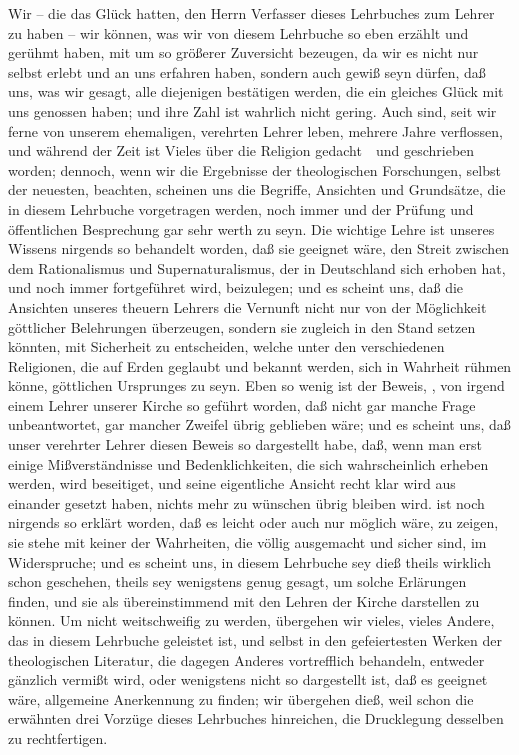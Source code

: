 Wir -- die das Glück hatten, den Herrn Verfasser dieses Lehrbuches zum Lehrer zu haben -- wir können, was wir von diesem Lehrbuche so eben erzählt und gerühmt haben, mit um so größerer Zuversicht bezeugen, da wir es nicht nur selbst erlebt und an uns erfahren haben, sondern auch gewiß seyn dürfen, daß uns, was wir gesagt, alle diejenigen bestätigen werden, die ein gleiches Glück mit uns genossen haben; und ihre Zahl ist wahrlich nicht gering. Auch sind, seit wir ferne von unserem ehemaligen, verehrten Lehrer leben, mehrere Jahre verflossen, und während der Zeit ist Vieles über die Religion gedacht~\ und geschrieben worden; dennoch, wenn wir die Ergebnisse der theologischen Forschungen, selbst der neuesten, beachten, scheinen uns die Begriffe, Ansichten und Grundsätze, die in diesem Lehrbuche vorgetragen werden, noch immer  und der Prüfung und öffentlichen Besprechung gar sehr werth zu seyn. Die wichtige Lehre  ist unseres Wissens nirgends so behandelt worden, daß sie geeignet wäre, den Streit zwischen dem Rationalismus und Supernaturalismus, der in Deutschland sich erhoben hat, und noch immer fortgeführet wird, beizulegen; und es scheint uns, daß die Ansichten unseres theuern Lehrers die Vernunft nicht nur von der Möglichkeit göttlicher Belehrungen überzeugen, sondern sie zugleich in den Stand setzen könnten, mit Sicherheit zu entscheiden, welche unter den verschiedenen Religionen, die auf Erden geglaubt und bekannt werden, sich in Wahrheit rühmen könne, göttlichen Ursprunges zu seyn. Eben so wenig ist der Beweis, , von irgend einem Lehrer unserer Kirche so geführt worden, daß nicht gar manche Frage unbeantwortet, gar mancher Zweifel übrig geblieben wäre; und es scheint uns, daß unser verehrter Lehrer diesen Beweis so dargestellt habe, daß, wenn man erst einige Mißverständnisse und Bedenklichkeiten, die sich wahrscheinlich erheben werden, wird beseitiget, und seine eigentliche Ansicht recht klar wird aus einander gesetzt haben, nichts mehr zu wünschen übrig bleiben wird.  ist noch nirgends so erklärt worden, daß es leicht oder auch nur möglich wäre, zu zeigen, sie stehe mit keiner der Wahrheiten, die völlig ausgemacht und sicher sind, im Widerspruche; und es scheint uns, in diesem Lehrbuche sey dieß theils wirklich schon geschehen, theils sey wenigstens genug gesagt, um solche Erlärungen finden, und sie als übereinstimmend mit den Lehren der Kirche darstellen zu können. Um nicht weitschweifig zu werden, übergehen wir vieles, vieles Andere, das in diesem Lehrbuche geleistet ist, und selbst in den gefeiertesten Werken der theologischen Literatur, die dagegen Anderes vortrefflich behandeln, entweder gänzlich vermißt wird, oder wenigstens nicht so dargestellt ist, daß es geeignet wäre, allgemeine Anerkennung zu finden; wir übergehen dieß, weil schon die erwähnten drei Vorzüge dieses Lehrbuches hinreichen, die Drucklegung desselben zu rechtfertigen.\par

